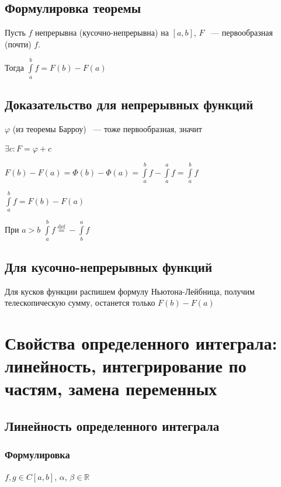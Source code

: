 \documentclass{article}
\begin{document}
		\subsection{Формулировка теоремы}
		
			Пусть $f$ непрерывна (кусочно-непрерывна) на $[a, b]$, $F$ ~--- первообразная (почти) $f$. 
		
			Тогда $\int\limits^b_a f = F(b) - F(a)$
		
		\subsection{Доказательство для непрерывных функций}
		
			$\varphi$ (из теоремы Барроу) ~--- тоже первообразная, значит
			
			$\exists c : F = \varphi + c$
			
			$F(b) - F(a) = \Phi(b) - \Phi(a) = \int\limits^b_a f - \int\limits^a_a f = \int\limits^b_a f$
			
			$\int\limits^b_a f = F(b) - F(a)$
			
			При $a > b$ $\int\limits^b_a f \stackrel{\mathrm{def}}{=} - \int\limits^a_b f$
			
        \subsection{Для кусочно-непрерывных функций}
        
            Для кусков функции распишем формулу Ньютона-Лейбница, получим телескопическую сумму, останется только $F(b) - F(a)$
            
	\newpage
	
	\section{Свойства определенного интеграла: линейность, интегрирование по частям, замена переменных}
	
		\subsection{Линейность определенного интеграла}
		
			\subsubsection{Формулировка}
			
                $f, g \in C[a, b]$, $\alpha$, $\beta \in \mathbb{R}$
			
\end{document}
